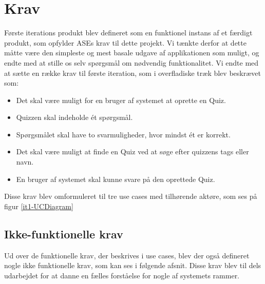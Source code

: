 \section{Krav}
Første iterations produkt blev defineret som en funktionel instans af et færdigt produkt, som opfylder ASEs krav til dette projekt. Vi tænkte derfor at dette måtte være den simpleste og mest basale udgave af applikationen som muligt, og endte med at stille os selv spørgsmål om nødvendig funktionalitet.
Vi endte med at sætte en række krav til første iteration, som i overfladiske træk blev beskrævet som:
\begin{itemize}
	\item Det skal være muligt for en bruger af systemet at oprette en Quiz.
	\item Quizzen skal indeholde ét spørgsmål.
	\item Spørgsmålet skal have to svarmuligheder, hvor mindst ét er korrekt.
	\item Det skal være muligt at finde en Quiz ved at søge efter quizzens tags eller navn.
	\item En bruger af systemet skal kunne svare på den oprettede Quiz.
\end{itemize}

Disse krav blev omformuleret til tre use cases med tilhørende aktøre, som ses på figur \ref{it1-UCDiagram}


\subsection*{Ikke-funktionelle krav}
Ud over de funktionelle krav, der beskrives i use cases, blev der også defineret nogle ikke funktionelle krav, som kan ses i følgende afsnit. Disse krav blev til dels udarbejdet for at danne en fælles forståelse for nogle af systemets rammer.

